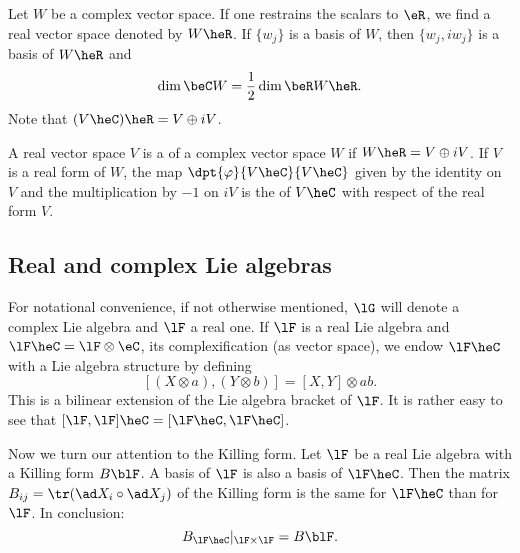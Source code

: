 Let $W$ be a complex vector space. If one restrains the scalars to $\eR$, we find a real vector space denoted by $W\heR$. If $\{w_j\}$ is a basis of $W$, then $\{w_j,iw_j\}$ is a basis of $W\heR$ and 
\[
  \dim\beC W=\frac{1}{2}\dim\beR W\heR.
\]
Note that $(V\heC)\heR=V\oplus iV$.

A real vector space $V$ is a  of a complex vector space $W$ if $W\heR=V\oplus iV$. If $V$ is a real form of $W$, the map $\dpt{\varphi}{V\heC}{V\heC}$ given by the identity on $V$ and the multiplication by $-1$ on $iV$ is the  of $V\heC$ with respect of the real form $V$.

\subsection{Real and complex Lie algebras}

For notational convenience, if not otherwise mentioned, $\lG$ will denote a complex Lie algebra and $\lF$ a real one. If $\lF$ is a real Lie algebra and $\lF\heC=\lF\otimes\eC$, its complexification (as vector space), we endow $\lF\heC$ with a Lie algebra structure by defining
\[
  [ (X\otimes a),(Y\otimes b)  ]=[X,Y]\otimes ab.
\]
This is a bilinear extension of the Lie algebra bracket of $\lF$. It is rather easy to see that $[\lF,\lF]\heC=[\lF\heC,\lF\heC]$.

Now we turn our attention to the Killing form. Let $\lF$ be a real Lie algebra with a Killing form $B\blF$. A basis of $\lF$ is also a basis of $\lF\heC$. Then the matrix $B_{ij}=\tr( \ad X_i\circ\ad X_j )$ of the Killing form is the same for $\lF\heC$ than for $\lF$. In conclusion:
\[
   B_{\lF\heC}|_{\lF\times\lF}=B\blF.
\]

